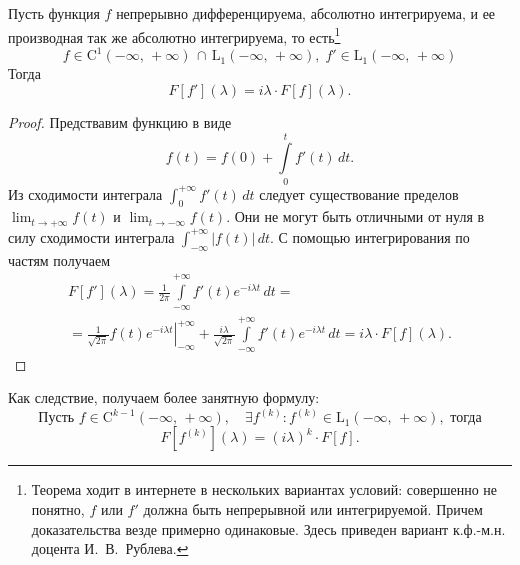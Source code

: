 \begin{theorem}
        Пусть функция $f$ непрерывно дифференцируема, абсолютно интегрируема, и ее производная так же абсолютно интегрируема, то есть\footnote{Теорема ходит в интернете в нескольких вариантах условий: совершенно не понятно, $f$ или $f'$ должна быть непрерывной или интегрируемой. Причем доказательства везде примерно одинаковые. Здесь приведен вариант к.ф.-м.н. доцента И.~В.~Рублева.}
$$
        f \in \mathrm{C}^1(-\infty,\,+\infty)\,\cap\,\mathrm{L}_1(-\infty,\,+\infty),\;f' \in \mathrm{L}_1(-\infty,\,+\infty)
$$
        Тогда
$$
        F[f'](\lambda) = i\lambda \cdot F[f](\lambda).
$$
\end{theorem}
\begin{proof}
        Предствавим функцию в виде
$$
        f(t) = f(0) + \int\limits_{0}^{t} f'(t)\,dt.
$$
        Из сходимости интеграла $\int_0^{+\infty}f'(t)\,dt$ следует существование пределов $\lim_{t\to+\infty}f(t)$ и $\lim_{t\to-\infty}f(t)$. Они не могут быть отличными от нуля в силу сходимости интеграла $\int_{-\infty}^{+\infty}|f(t)|\,dt$. С помощью интегрирования по частям получаем
\begin{multline*}
        F[f'](\lambda) = \frac{1}{2\pi}\int\limits_{-\infty}^{+\infty}f'(t)e^{-i\lambda t}\,dt=\\
        =
        \left.\frac{1}{\sqrt{2\pi}}f(t)e^{-i\lambda t}\right|_{-\infty}^{+\infty}
        +
        \frac{i\lambda}{\sqrt{2\pi}}\int\limits_{-\infty}^{+\infty}f'(t)e^{-i\lambda t}\,dt
        = i\lambda\cdot F[f](\lambda).
\end{multline*}
\end{proof}
\begin{remark}
        Как следствие, получаем более занятную формулу:
$$
        \mbox{Пусть } f \in \mathrm{C}^{k-1}(-\infty,\,+\infty),\quad \exists f^{(k)}:f^{(k)}\in\mathrm{L}_1(-\infty,\,+\infty), \mbox{ тогда} 
$$
\begin{equation}
        F[f^{(k)}](\lambda) = (i\lambda)^k\cdot F[f].
\end{equation}
\end{remark}

